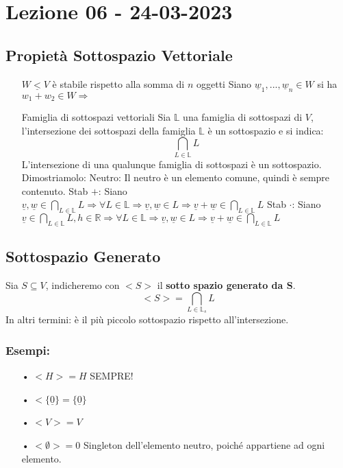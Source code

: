 \section{Lezione 06 - 24-03-2023}

\subsection{Propietà Sottospazio Vettoriale}

\begin{itemize}
\item[$W \underline{<} V$ è stabile rispetto alla somma di $n$ oggetti]
Siano $\underline{w}_1, ... , \underline{w}_n \in W$ si ha $w_1 + w_2 \in W \Rightarrow$ 
\item[Famiglia di sottospazi vettoriali]
Sia $ \mathbb{L}$ una famiglia di sottospazi di $V$, l'intersezione dei sottospazi della famiglia $\mathbb{L}$ è un sottospazio e si indica: 
$$ \bigcap_{L \in \mathbb{L}} L $$
L'intersezione di una qualunque famiglia di sottospazi è un sottospazio.\\
Dimostriamolo: 
	\subitem Neutro: Il neutro è un elemento comune, quindi è sempre contenuto.
	\subitem Stab $+$: Siano $ \underline{v},\underline{w} \in \bigcap_{L \in \mathbb{L}} L \Rightarrow \forall L \in \mathbb{L} \Rightarrow \underline{v},\underline{w} \in L \Rightarrow \underline{v}+\underline{w} \in \bigcap_{L \in \mathbb{L}} L $
	\subitem Stab $\cdot$: Siano $ \underline{v} \in \bigcap_{L \in \mathbb{L}} L, h \in \mathbb{R} \Rightarrow \forall L \in \mathbb{L} \Rightarrow \underline{v},\underline{w} \in L \Rightarrow \underline{v}+\underline{w} \in \bigcap_{L \in \mathbb{L}} L $
\end{itemize}

\subsection{Sottospazio Generato}
Sia $ S \subseteq V $, indicheremo con $<S>$ il \textbf{sotto spazio generato da S}.\\
$$ <S> = \bigcap_{L \in \mathbb{L}_s} L$$
In altri termini: è il più piccolo sottospazio rispetto all'intersezione.

\subsubsection{Esempi:}
\begin{itemize}
\item[•] $ <H> = H $ SEMPRE!
\item[•] $ <\{\underline{0}\} = \{\underline{0}\} $
\item[•] $ <V> = V $ 
\item[•] $ <\emptyset> = {0} $ Singleton dell'elemento neutro, poiché appartiene ad ogni elemento.
\end{itemize}

